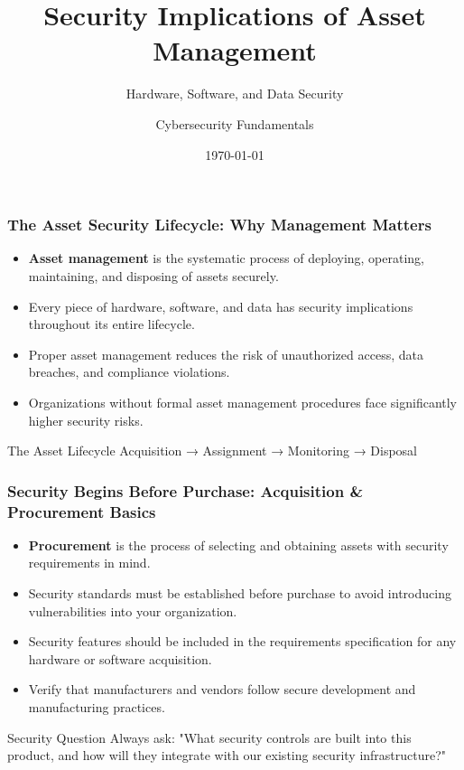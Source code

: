 \documentclass{beamer}
\title{Security Implications of Asset Management}
\subtitle{Hardware, Software, and Data Security}
\author{Cybersecurity Fundamentals}
\date{\today}
\begin{document}
\begin{frame}
\titlepage
\end{frame}

\begin{frame}
\frametitle{The Asset Security Lifecycle: Why Management Matters}
\begin{itemize}
\item \textbf{Asset management} is the systematic process of deploying, operating, maintaining, and disposing of assets securely.
\item Every piece of hardware, software, and data has security implications throughout its entire lifecycle.
\item Proper asset management reduces the risk of unauthorized access, data breaches, and compliance violations.
\item Organizations without formal asset management procedures face significantly higher security risks.
\end{itemize}

\begin{block}{The Asset Lifecycle}
Acquisition → Assignment → Monitoring → Disposal
\end{block}
\end{frame}

\begin{frame}
\frametitle{Security Begins Before Purchase: Acquisition \& Procurement Basics}
\begin{itemize}
\item \textbf{Procurement} is the process of selecting and obtaining assets with security requirements in mind.
\item Security standards must be established before purchase to avoid introducing vulnerabilities into your organization.
\item Security features should be included in the requirements specification for any hardware or software acquisition.
\item Verify that manufacturers and vendors follow secure development and manufacturing practices.
\end{itemize}

\begin{alertblock}{Security Question}
Always ask: "What security controls are built into this product, and how will they integrate with our existing security infrastructure?"
\end{alertblock}
\end{frame}
\end{document}
